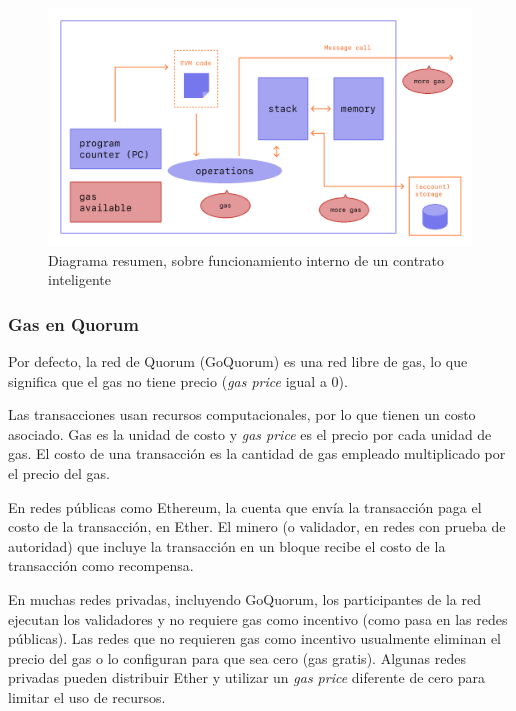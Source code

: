       \begin{figure}[h!]
        \centering
        \includegraphics[scale=0.4]{Graphics/gas.png}
        \caption{Diagrama resumen, sobre funcionamiento interno de un contrato inteligente}
        \label{figure:smart_contract_squeme}
      \end{figure}

      \subsubsection{Gas en Quorum}
      Por defecto, la red de Quorum (GoQuorum) es una red libre de gas, lo que significa que el gas no 
      tiene precio (\textit{gas price} igual a 0).


      Las transacciones usan recursos computacionales, por lo que tienen un costo asociado.
      Gas es la unidad de costo y \textit{gas price} es el precio por cada unidad de gas. El costo de
      una transacción es la cantidad de gas empleado multiplicado por el precio del gas. 
      
      En redes públicas como Ethereum, la cuenta que envía la transacción paga el costo de la transacción,
      en Ether. El minero (o validador, en redes con prueba de autoridad) que incluye la 
      transacción en un bloque recibe el costo de la transacción como recompensa.


      En muchas redes privadas, incluyendo GoQuorum, los participantes de la red ejecutan los 
      validadores y no requiere gas como incentivo (como pasa en las redes públicas). Las redes que no 
      requieren gas como incentivo usualmente eliminan el precio del gas o lo configuran para que sea cero
      (gas gratis). Algunas redes privadas pueden distribuir Ether y utilizar un \textit{gas price}
      diferente de cero para limitar el uso de recursos.


